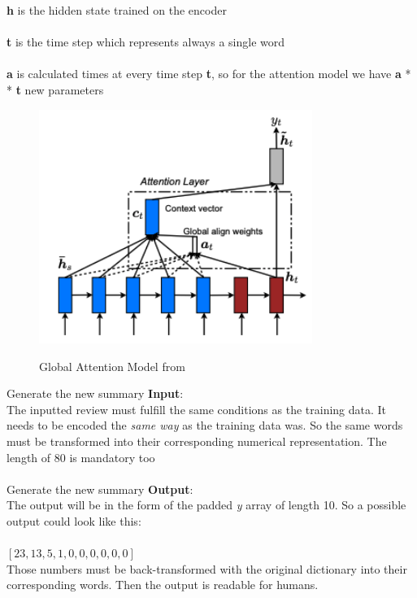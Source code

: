 \begin{tcolorbox}
	\textbf{h} is the hidden state trained on the encoder \\ \\
	\textbf{t} is the time step which represents always a single word \\ \\
	\textbf{a} is calculated  times at every time step \textbf{t}, so for the attention model we have \textbf{a} *  \textbf{t} new parameters
\end{tcolorbox}

\begin{figure}
	\begin{center}
		\includegraphics[width=3.5in]{photos/glob_att}\\
		\caption{Global Attention Model from \cite{effectiveattn}}\label{glob}
	\end{center}
\end{figure}

\begin{tcolorbox}
	Generate the new summary \textbf{Input}: \\
	
	The inputted review must fulfill the same conditions as the training data. It needs to be encoded the \textit{same way} as the training data was. So the same words must be transformed into their corresponding numerical representation. The length of 80 is mandatory too \\\\
	
	
	Generate the new summary \textbf{Output}: \\
	
	The output will be in the form of the padded \textit{y} array of length 10. So a possible output could look like this: \\\\
	\([23, 13, 5, 1, 0, 0, 0, 0, 0, 0]\) \\
	
	Those numbers must be back-transformed with the original dictionary into their corresponding words. Then the output is readable for humans.
\end{tcolorbox}

